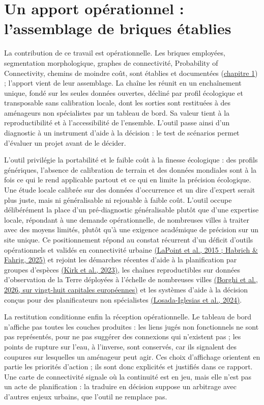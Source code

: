 \documentclass[a4paper,11pt]{report}
\begin{document}
\section{Un apport opérationnel : l'assemblage de briques établies}\label{sec:4.5}

La contribution de ce travail est opérationnelle. Les briques employées, segmentation morphologique, graphes de connectivité, Probability of Connectivity, chemins de moindre coût, sont établies et documentées (\hyperref[chap:1]{chapitre 1}) ; l'apport vient de leur assemblage. La chaîne les réunit en un enchaînement unique, fondé sur les seules données ouvertes, décliné par profil écologique et transposable sans calibration locale, dont les sorties sont restituées à des aménageurs non spécialistes par un tableau de bord. Sa valeur tient à la reproductibilité et à l'accessibilité de l'ensemble. L'outil passe ainsi d'un diagnostic à un instrument d'aide à la décision : le test de scénarios permet d'évaluer un projet avant de le décider.

L'outil privilégie la portabilité et le faible coût à la finesse écologique : des profils génériques, l'absence de calibration de terrain et des données mondiales sont à la fois ce qui le rend applicable partout et ce qui en limite la précision écologique. Une étude locale calibrée sur des données d'occurrence et un dire d'expert serait plus juste, mais ni généralisable ni rejouable à faible coût. L'outil occupe délibérément la place d'un pré-diagnostic généralisable plutôt que d'une expertise locale, répondant à une demande opérationnelle, de nombreuses villes à traiter avec des moyens limités, plutôt qu'à une exigence académique de précision sur un site unique. Ce positionnement répond au constat récurrent d'un déficit d'outils opérationnels et validés en connectivité urbaine \hyperref[sec:bibliographie]{(LaPoint et al., 2015 ; Habrich \& Fahrig, 2025)} et rejoint les démarches récentes d'aide à la planification par groupes d'espèces \hyperref[sec:bibliographie]{(Kirk et al., 2023)}, les chaînes reproductibles sur données d'observation de la Terre déployées à l'échelle de nombreuses villes \hyperref[sec:bibliographie]{(Borghi et al., 2026, sur vingt-huit capitales européennes)} et les systèmes d'aide à la décision conçus pour des planificateurs non spécialistes \hyperref[sec:bibliographie]{(Losada-Iglesias et al., 2024)}.

La restitution conditionne enfin la réception opérationnelle. Le tableau de bord n'affiche pas toutes les couches produites : les liens jugés non fonctionnels ne sont pas représentés, pour ne pas suggérer des connexions qui n'existent pas ; les points de rupture sur l'eau, à l'inverse, sont conservés, car ils signalent des coupures sur lesquelles un aménageur peut agir. Ces choix d'affichage orientent en partie les priorités d'action ; ils sont donc explicités et justifiés dans ce rapport. Une carte de connectivité signale où la continuité est en jeu, mais elle n'est pas un acte de planification : la traduire en décision suppose un arbitrage avec d'autres enjeux urbains, que l'outil ne remplace pas.
\end{document}
